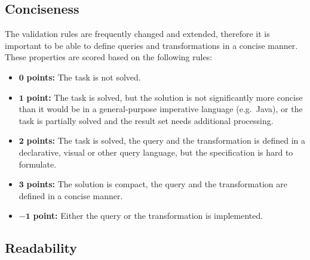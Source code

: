 \documentclass[submission,copyright,creativecommons]{eptcs}
\begin{document}
\noindent{}

\subsection{Conciseness}

The validation rules are frequently changed and extended, therefore it is important to be able to define queries and transformations in a concise manner. These properties are scored based on the following rules:

\begin{itemize}
	\item $\mathbf{0}$   \textbf{points:} The task is not solved.
	\item $\mathbf{1}$   \textbf{point:} The task is solved, but the solution is not significantly more concise than it would be in a general-purpose imperative language (e.g.\ Java), or the task is partially solved and the result set needs additional processing.
	\item $\mathbf{2}$   \textbf{points:} The task is solved, the query and the transformation is defined in a declarative, visual or other query language, but the specification is hard to formulate.
	\item $\mathbf{3}$   \textbf{points:} The solution is compact, the query and the transformation are defined in a concise manner.
	\item $\mathbf{-1}$  \textbf{point:} Either the query or the transformation is implemented.
\end{itemize}

\noindent{}

\subsection{Readability}
\end{document}
